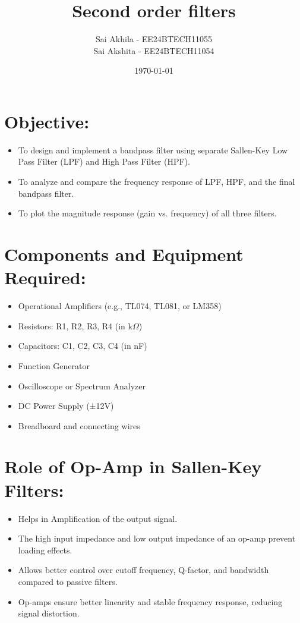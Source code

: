 \documentclass[a4paper,12pt]{article}
\title{\textbf{Second order filters}}
\author{Sai Akhila - EE24BTECH11055 \\Sai Akshita - EE24BTECH11054}
\date{\today}
\begin{document}
\maketitle

\section{Objective:}
\begin{itemize}
    \item To design and implement a bandpass filter using separate Sallen-Key Low Pass Filter (LPF) and High Pass Filter (HPF).
    \item To analyze and compare the frequency response of LPF, HPF, and the final bandpass filter.
    \item To plot the magnitude response (gain vs. frequency) of all three filters.
\end{itemize}

\section{Components and Equipment Required:}
\begin{itemize}
\item  Operational Amplifiers (e.g., TL074, TL081, or LM358)
\item  Resistors: R1, R2, R3, R4 (in k$\Omega$)
\item  Capacitors: C1, C2, C3, C4 (in nF)
\item  Function Generator
\item  Oscilloscope or Spectrum Analyzer
\item  DC Power Supply (±12V)
\item  Breadboard and connecting wires
\end{itemize}


\section{Role of Op-Amp in Sallen-Key Filters:}
\begin{itemize}
    \item Helps in Amplification of the output signal.
    \item The high input impedance and low output impedance of an op-amp prevent loading effects.
    \item Allows better control over cutoff frequency, Q-factor, and bandwidth compared to passive filters.
    \item Op-amps ensure better linearity and stable frequency response, reducing signal distortion.
\end{itemize}
\end{document}
